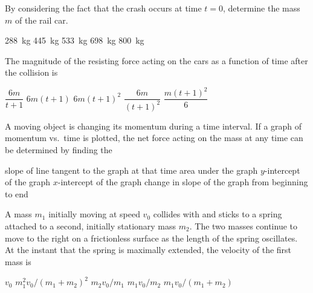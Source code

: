\documentclass{../../oss-apphys-exam}
\begin{document}
\begin{multicols*}{2}
\begin{questions}

    \question By considering the fact that the crash occurs at time $t=0$,
    determine the mass $m$ of the rail car.
    \label{remote1}
    \begin{choices}
      \choice\SI{288}{\kilo\gram}
      \choice\SI{445}{\kilo\gram}
      \choice\SI{533}{\kilo\gram}
      \choice\SI{698}{\kilo\gram}
      \choice\SI{800}{\kilo\gram}
    \end{choices}
    
    \question The magnitude of the resisting force acting on the cars as a
    function of time after the collision is
    \label{remote2}
    \begin{choices}
      \choice $\dfrac{6m}{t+1}$
      \choice $6m(t+1)$
      \choice $6m(t+1)^2$
      \choice $\dfrac{6m}{(t+1)^2}$
      \choice $\dfrac{m(t+1)^2}6$
    \end{choices}

    \question A moving object is changing its momentum during a time interval.
    If a graph of momentum vs.\ time is plotted, the net force acting on the
    mass at any time can be determined by finding the
    \begin{choices}
      \choice slope of line tangent to the graph at that time
      \choice area under the graph
      \choice $y$-intercept of the graph
      \choice $x$-intercept of the graph
      \choice change in slope of the graph from beginning to end
    \end{choices}
    
    \question A mass $m_1$ initially moving at speed $v_0$ collides with and
    sticks to a spring attached to a second, initially stationary mass $m_2$.
    The two masses continue to move to the right on a frictionless surface as
    the length of the spring oscillates. At the instant that the spring is
    maximally extended, the velocity of the first mass is
    \begin{center}
    \end{center}
    \begin{choices}
      \choice $v_0$
      \choice $m_1^2v_0/(m_1+m_2)^2$
      \choice $m_2v_0/m_1$
      \choice $m_1v_0/m_2$
      \choice $m_1v_0/(m_1+m_2)$
    \end{choices}
  \end{questions}
\end{multicols*}
\end{document}
